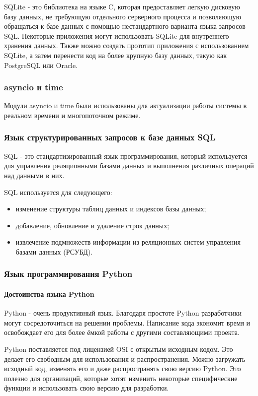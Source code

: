 SQLite - это библиотека на языке C, которая предоставляет легкую дисковую базу данных, не требующую отдельного серверного процесса и позволяющую обращаться к базе данных с помощью нестандартного варианта языка запросов SQL. Некоторые приложения могут использовать SQLite для внутреннего хранения данных. Также можно создать прототип приложения с использованием SQLite, а затем перенести код на более крупную базу данных, такую как PostgreSQL или Oracle.

\subsubsection {asyncio и time}
Модули asyncio и time были использованы для актуализации работы системы в реальном времени и многопоточном режиме.


\subsubsection{Язык структурированных запросов к базе данных SQL}
SQL - это стандартизированный язык программирования, который используется для управления реляционными базами данных и выполнения различных операций над данными в них. 

SQL используется для следующего:
\begin{itemize}
	\item изменение структуры таблиц данных и индексов базы данных;
	\item добавление, обновление и удаление строк данных;
	\item извлечение подмножеств информации из реляционных систем управления базами данных (РСУБД).
\end{itemize}


\subsubsection{Язык программирования Python}

\paragraph{Достоинства языка Python}
Python - очень продуктивный язык. Благодаря простоте Python разработчики могут сосредоточиться на решении проблемы. Написание кода экономит время и освобождает его для более ёмкой работы с другими составляющими проекта.

Python поставляется под лицензией OSI с открытым исходным кодом. Это делает его свободным для использования и распространения. Можно загружать исходный код, изменять его и даже распространять свою версию Python. Это полезно для организаций, которые хотят изменить некоторые специфические функции и использовать свою версию для разработки.

